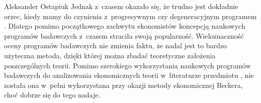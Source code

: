 \begin{artplenv}{Aleksander Ostapiuk}
Jednak z~czasem okazało się, że trudno jest dokładnie orzec, kiedy mamy do czynienia z~progresywnym czy degeneracyjnym
programem
\parencite{marchi_appraising_1991,blaug_ugly_1997,hands_second_1990}.
Dlatego pomimo początkowego zachwytu ekonomistów
koncepcją naukowych programów badawczych z~czasem straciła swoją popularność. Wieloznaczność oceny programów badawczych nie zmienia
faktu, że nadal jest to bardzo użyteczna metoda, dzięki której można zbadać teoretyczne założenia poszczególnych
teorii. Pomimo szerokiego wykorzystania naukowych programów badawczych do analizowania ekonomicznych
teorii w~literaturze przedmiotu
\parencites[zob.][]{drakopoulos_review_2005}[s.~299–300]{hands_reflection_2001},
nie została
ona w~pełni wykorzystana przy okazji metody ekonomicznej Beckera, choć dobrze się do tego nadaje. 


\end{artplenv}
